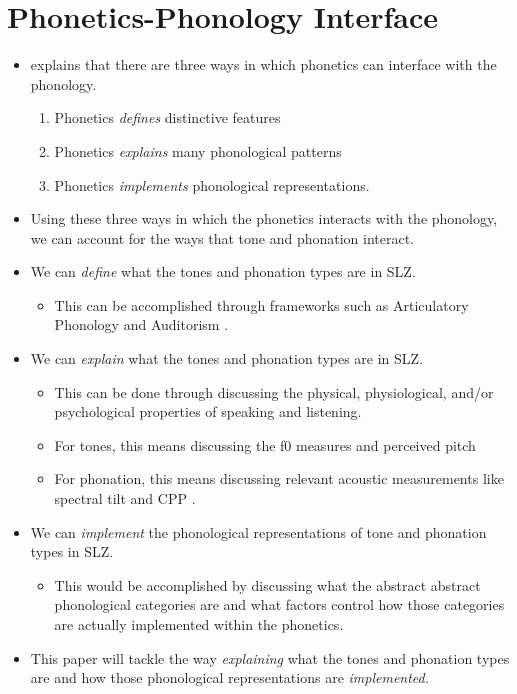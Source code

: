 \documentclass[12pt, letterpaper]{article}
\begin{document}
\section{Phonetics-Phonology Interface} \label{sec:Interface}
\begin{itemize}
	\item \citet{kingstonPhoneticsPhonologyInterface2007} explains that there are three ways in which phonetics can interface with the phonology. 
	\begin{enumerate}
		\item Phonetics \textit{defines} distinctive features
		\item Phonetics \textit{explains} many phonological patterns
		\item Phonetics \textit{implements} phonological representations. 
	\end{enumerate}

	\item Using these three ways in which the phonetics interacts with the phonology, we can account for the ways that tone and phonation interact. 
	\item We can \textit{define} what the tones and phonation types are in SLZ.
		\begin{itemize}
		 	\item This can be accomplished through frameworks such as Articulatory Phonology \citep{browmanArticulatoryPhonologyOverview1992} and Auditorism \citep{kingstonPhoneticKnowledge1994,kingstonIntermediatePropertiesPerception1995}. 
		\end{itemize} 

	\item We can \textit{explain} what the tones and phonation types are in SLZ. 
		\begin{itemize}
			\item This can be done through discussing the physical, physiological, and/or psychological properties of speaking and listening.
			\item For tones, this means discussing the f0 measures and perceived pitch
			\item For phonation, this means discussing relevant acoustic measurements like spectral tilt and CPP \citep{garellekPhoneticsVoice2019}. 
		\end{itemize}

	\item We can \textit{implement} the phonological representations of tone and phonation types in SLZ. 
		\begin{itemize}
			\item This would be accomplished by discussing what the abstract abstract phonological categories are and what factors control how those categories are actually implemented within the phonetics.  
		\end{itemize}

	\item This paper will tackle the way \textit{explaining} what the tones and phonation types are and how those phonological representations are \textit{implemented.}
\end{itemize}
\end{document}
